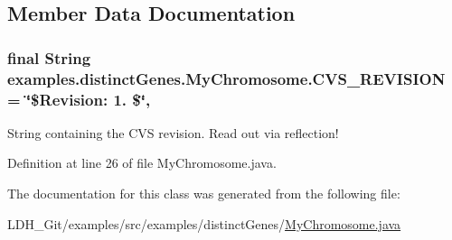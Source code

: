 \subsection{Member Data Documentation}
\hypertarget{classexamples_1_1distinct_genes_1_1_my_chromosome_aa89d266606b44f54ad8a235722f5ecd1}{
\subsubsection[{C\-V\-S\-\_\-\-R\-E\-V\-I\-S\-I\-O\-N}]{\setlength{\rightskip}{0pt plus 5cm}final String examples.\-distinct\-Genes.\-My\-Chromosome.\-C\-V\-S\-\_\-\-R\-E\-V\-I\-S\-I\-O\-N = \char`\"{}\$Revision\-: 1. \$\char`\"{}\hspace{0.3cm}{\ttfamily [static]}, {\ttfamily [private]}}}\label{classexamples_1_1distinct_genes_1_1_my_chromosome_aa89d266606b44f54ad8a235722f5ecd1}
String containing the C\-V\-S revision. Read out via reflection! 

Definition at line 26 of file My\-Chromosome.\-java.



The documentation for this class was generated from the following file\-:\begin{DoxyCompactItemize}
\item 
L\-D\-H\-\_\-\-Git/examples/src/examples/distinct\-Genes/\hyperlink{_my_chromosome_8java}{My\-Chromosome.\-java}\end{DoxyCompactItemize}
